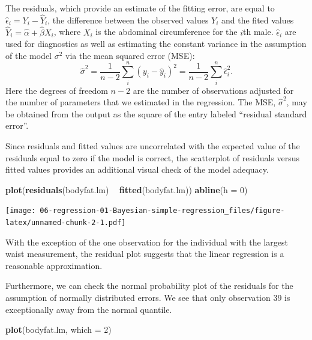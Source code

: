 \documentclass[]{book}
\newenvironment{Shaded}{\begin{snugshade}}{\end{snugshade}}
\newcommand{\KeywordTok}[1]{\textcolor[rgb]{0.13,0.29,0.53}{\textbf{#1}}}
\newcommand{\DataTypeTok}[1]{\textcolor[rgb]{0.13,0.29,0.53}{#1}}
\newcommand{\DecValTok}[1]{\textcolor[rgb]{0.00,0.00,0.81}{#1}}
\newcommand{\StringTok}[1]{\textcolor[rgb]{0.31,0.60,0.02}{#1}}
\newcommand{\OperatorTok}[1]{\textcolor[rgb]{0.81,0.36,0.00}{\textbf{#1}}}
\newcommand{\NormalTok}[1]{#1}
\theoremstyle{definition}
\theoremstyle{definition}
\theoremstyle{definition}
\theoremstyle{remark}
\begin{document}
The residuals, which provide an estimate of the fitting error, are equal
to \(\hat{\epsilon}_i = Y_i - \hat{Y}_i\), the difference between the
observed values \(Y_i\) and the fited values
\(\hat{Y}_i = \hat{\alpha} + \hat{\beta}X_i\), where \(X_i\) is the
abdominal circumference for the \(i\)th male. \(\hat{\epsilon}_i\) are
used for diagnostics as well as estimating the constant variance in the
assumption of the model \(\sigma^2\) via the mean squared error (MSE):
\[ \hat{\sigma}^2 = \frac{1}{n-2}\sum_i^n (y_i-\hat{y}_i)^2 = \frac{1}{n-2}\sum_i^n \hat{\epsilon}_i^2. \]
Here the degrees of freedom \(n-2\) are the number of observations
adjusted for the number of parameters that we estimated in the
regression. The MSE, \(\hat{\sigma}^2\), may be obtained from the output
as the square of the entry labeled ``residual standard error''.

Since residuals and fitted values are uncorrelated with the expected
value of the residuals equal to zero if the model is correct, the
scatterplot of residuals versus fitted values provides an additional
visual check of the model adequacy.

\begin{Shaded}
\begin{Highlighting}[]
\KeywordTok{plot}\NormalTok{(}\KeywordTok{residuals}\NormalTok{(bodyfat.lm) }\OperatorTok{~}\StringTok{ }\KeywordTok{fitted}\NormalTok{(bodyfat.lm))}
\KeywordTok{abline}\NormalTok{(}\DataTypeTok{h =} \DecValTok{0}\NormalTok{)}
\end{Highlighting}
\end{Shaded}

\texttt{[image: 06-regression-01-Bayesian-simple-regression\_files/figure-latex/unnamed-chunk-2-1.pdf]}

With the exception of the one observation for the individual with the
largest waist measurement, the residual plot suggests that the linear
regression is a reasonable approximation.

Furthermore, we can check the normal probability plot of the residuals
for the assumption of normally distributed errors. We see that only
observation 39 is exceptionally away from the normal quantile.

\begin{Shaded}
\begin{Highlighting}[]
\KeywordTok{plot}\NormalTok{(bodyfat.lm, }\DataTypeTok{which =} \DecValTok{2}\NormalTok{)}
\end{Highlighting}
\end{Shaded}
\end{document}
